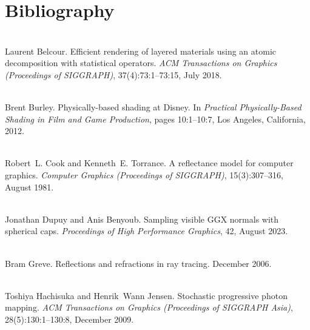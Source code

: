 \chapter{Bibliography}
\hypertarget{citelist}{}\label{citelist}

\begin{DoxyDescription}
\item[\label{citelist_CITEREF_Belcour:2018:Efficient}%
\Hypertarget{citelist_CITEREF_Belcour:2018:Efficient}%
\mbox{[}1\mbox{]}]\hfill \\
Laurent Belcour. Efficient rendering of layered materials using an atomic decomposition with statistical operators. {\itshape ACM Transactions on Graphics (Proceedings of SIGGRAPH)}, 37(4)\+:73\+:1--73\+:15, July 2018. 


\item[\label{citelist_CITEREF_Burley:2012:Physicallybased}%
\Hypertarget{citelist_CITEREF_Burley:2012:Physicallybased}%
\mbox{[}2\mbox{]}]\hfill \\
Brent Burley. Physically-\/based shading at Disney. In {\itshape Practical Physically-\/\+Based Shading in Film and Game Production}, pages 10\+:1--10\+:7, Los Angeles, California, 2012.


\item[\label{citelist_CITEREF_Cook:1981:Reflectance}%
\Hypertarget{citelist_CITEREF_Cook:1981:Reflectance}%
\mbox{[}3\mbox{]}]\hfill \\
Robert~L. Cook and Kenneth~E. Torrance. A reflectance model for computer graphics. {\itshape Computer Graphics (Proceedings of SIGGRAPH)}, 15(3)\+:307--316, August 1981. 


\item[\label{citelist_CITEREF_Dupuy:2023:Sampling}%
\Hypertarget{citelist_CITEREF_Dupuy:2023:Sampling}%
\mbox{[}4\mbox{]}]\hfill \\
Jonathan Dupuy and Anis Benyoub. Sampling visible GGX normals with spherical caps. {\itshape Proceedings of High Performance Graphics}, 42, August 2023. 


\item[\label{citelist_CITEREF_Greve:2006:Reflections}%
\Hypertarget{citelist_CITEREF_Greve:2006:Reflections}%
\mbox{[}5\mbox{]}]\hfill \\
Bram Greve. Reflections and refractions in ray tracing. December 2006.


\item[\label{citelist_CITEREF_Hachisuka:2009:Stochastic}%
\Hypertarget{citelist_CITEREF_Hachisuka:2009:Stochastic}%
\mbox{[}6\mbox{]}]\hfill \\
Toshiya Hachisuka and Henrik~Wann Jensen. Stochastic progressive photon mapping. {\itshape ACM Transactions on Graphics (Proceedings of SIGGRAPH Asia)}, 28(5)\+:130\+:1--130\+:8, December 2009. 



\end{DoxyDescription}
